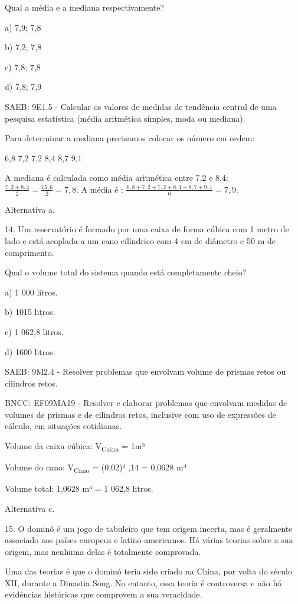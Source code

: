 \begin{escolha}
\begin{escolha}
\begin{escolha}
\begin{escolha}
{\begin{boxmedio}
\begin{boxpeq}
\begin{q°}
\begin{boxmedio}
\begin{boxpeq}
\begin{boxpeq}
\begin{boxmedio}
\begin{boxmedio}
\begin{boxmedio}
\begin{largebox}
\begin{boxmedio}
{\begin{escolha}
\begin{escolha}
\begin{escolha}
\begin{escolha}
\begin{escolha}
\begin{escolha}
{Qual a média e a mediana respectivamente?

a) 7,9; 7,8

b) 7,2; 7,8

c) 7,8; 7,8

d) 7,8; 7,9

SAEB: 9E1.5 - Calcular os valores de medidas de tendência central de uma
pesquisa estatística (média aritmética simples, moda ou mediana).

Para determinar a mediana precisamos colocar os número em ordem:

6,8 7,2 7,2 8,4 8,7 9,1

A mediana é calculada como média aritmética entre 7,2 e 8,4:
$\frac{7,2 + 8,4}{2} = \frac{15,6}{2} = 7,8$. A média é :
$\frac{6,8 + 7,2 + 7,2 + 8,4 + 8,7 + 9,1}{6} = 7,9$.

Alternativa a.

14. Um reservatório é formado por uma caixa de forma cúbica com 1 metro
de lado e está acoplada a um cano cilíndrico com 4 cm de diâmetro e 50 m
de comprimento.

Qual o volume total do sistema quando está completamente cheio?

a) 1 000 litros.

b) 1015 litros.

c) 1 062,8 litros.

d) 1600 litros.

SAEB: 9M2.4 - Resolver problemas que envolvam volume de prismas retos ou
cilindros retos.

BNCC: EF09MA19 - Resolver e elaborar problemas que envolvam medidas de
volumes de prismas e de cilindros retos, inclusive com uso de expressões
de cálculo, em situações cotidianas.

Volume da caixa cúbica: V\textsubscript{Caixa} = 1m³

Volume do cano: V\textsubscript{Cano} = (0,02)² ,14  = 0,0628 m³

Volume total: 1,0628 m³ = 1 062,8 litros.

Alternativa c.

15. O dominó é um jogo de tabuleiro que tem origem incerta, mas é
geralmente associado aos países europeus e latino-americanos. Há várias
teorias sobre a sua origem, mas nenhuma delas é totalmente comprovada.

Uma das teorias é que o dominó teria sido criado na China, por volta do
século XII, durante a Dinastia Song. No entanto, essa teoria é
controversa e não há evidências históricas que comprovem a sua
veracidade.

}
\end{escolha}
\end{escolha}
\end{escolha}
\end{escolha}
\end{escolha}
\end{escolha}}
\end{boxmedio}
\end{largebox}
\end{boxmedio}
\end{boxmedio}
\end{boxmedio}
\end{boxpeq}
\end{boxpeq}
\end{boxmedio}
\end{q°}
\end{boxpeq}
\end{boxmedio}}
\end{escolha}
\end{escolha}
\end{escolha}
\end{escolha}
